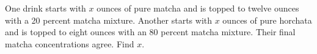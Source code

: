 One drink starts with $x$ ounces of pure matcha and is topped to twelve ounces with a 20 percent matcha mixture. Another starts with $x$ ounces of pure horchata and is topped to eight ounces with an 80 percent matcha mixture. Their final matcha concentrations agree. Find $x$.
